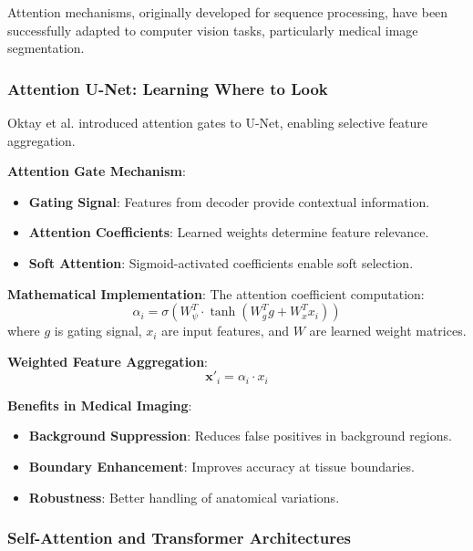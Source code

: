 \documentclass[12pt,a4paper]{article}
\begin{document}
Attention mechanisms, originally developed for sequence processing, have been successfully adapted to computer vision tasks, particularly medical image segmentation.

\subsubsection{Attention U-Net: Learning Where to Look}

Oktay et al. \cite{oktay2018attention} introduced attention gates to U-Net, enabling selective feature aggregation.

\textbf{Attention Gate Mechanism}:
\begin{itemize}
    \item \textbf{Gating Signal}: Features from decoder provide contextual information.
    \item \textbf{Attention Coefficients}: Learned weights determine feature relevance.
    \item \textbf{Soft Attention}: Sigmoid-activated coefficients enable soft selection.
\end{itemize}

\textbf{Mathematical Implementation}:
The attention coefficient computation:
\begin{equation}
\alpha_i = \sigma\left(W_\psi^T \cdot \tanh\left(W_g^T g + W_x^T x_i\right)\right)
\end{equation}
where $g$ is gating signal, $x_i$ are input features, and $W$ are learned weight matrices.

\textbf{Weighted Feature Aggregation}:
\begin{equation}
\mathbf{x}'_i = \alpha_i \cdot x_i
\end{equation}

\textbf{Benefits in Medical Imaging}:
\begin{itemize}
    \item \textbf{Background Suppression}: Reduces false positives in background regions.
    \item \textbf{Boundary Enhancement}: Improves accuracy at tissue boundaries.
    \item \textbf{Robustness}: Better handling of anatomical variations.
\end{itemize}

\subsubsection{Self-Attention and Transformer Architectures}
\end{document}
